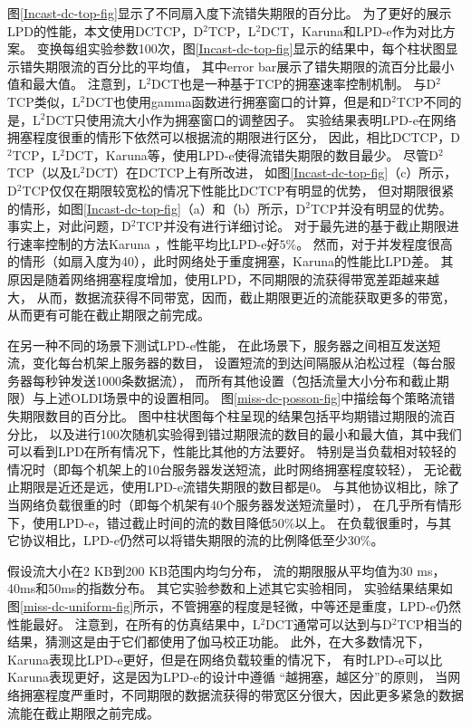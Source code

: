 图\ref{Incast-dc-top-fig}显示了不同扇入度下流错失期限的百分比。
为了更好的展示LPD的性能，本文使用DCTCP，D$^2$TCP，L$^2$DCT，Karuna和LPD-e作为对比方案。
变换每组实验参数100次，图\ref{Incast-dc-top-fig}显示的结果中，每个柱状图显示错失期限流的百分比的平均值，
其中error bar展示了错失期限的流百分比最小值和最大值。
注意到，L$^2$DCT也是一种基于TCP的拥塞速率控制机制。
与D$^2$TCP类似，L$^2$DCT也使用gamma函数进行拥塞窗口的计算，但是和D$^2$TCP不同的是，L$^2$DCT只使用流大小作为拥塞窗口的调整因子。
实验结果表明LPD-e在网络拥塞程度很重的情形下依然可以根据流的期限进行区分，
因此，相比DCTCP，D$^2$TCP，L$^2$DCT，Karuna等，使用LPD-e使得流错失期限的数目最少。
尽管D$^2$TCP（以及L$^2$DCT）在DCTCP上有所改进，
如图\ref{Incast-dc-top-fig}（c）所示，D$^2$TCP仅仅在期限较宽松的情况下性能比DCTCP有明显的优势，
但对期限很紧的情形，如图\ref{Incast-dc-top-fig}（a）和（b）所示，D$^2$TCP并没有明显的优势。
事实上，对此问题，D$^2$TCP\cite{D2TCP}并没有进行详细讨论。
对于最先进的基于截止期限进行速率控制的方法Karuna \cite{chen2016scheduling}，性能平均比LPD-e好$5\%$。
然而，对于并发程度很高的情形（如扇入度为40），此时网络处于重度拥塞，Karuna的性能比LPD差。
其原因是随着网络拥塞程度增加，使用LPD，不同期限的流获得带宽差距越来越大，
从而，数据流获得不同带宽，因而，截止期限更近的流能获取更多的带宽，从而更有可能在截止期限之前完成。



在另一种不同的场景下测试LPD-e性能，
在此场景下，服务器之间相互发送短流，变化每台机架上服务器的数目，
设置短流的到达间隔服从泊松过程（每台服务器每秒钟发送1000条数据流），
而所有其他设置（包括流量大小分布和截止期限）与上述OLDI场景中的设置相同。
图\ref{miss-dc-posson-fig}中描绘每个策略流错失期限数目的百分比。
图中柱状图每个柱呈现的结果包括平均期错过期限的流百分比，
以及进行100次随机实验得到错过期限流的数目的最小和最大值，其中我们可以看到LPD在所有情况下，性能比其他的方法要好。
特别是当负载相对较轻的情况时（即每个机架上的10台服务器发送短流，此时网络拥塞程度较轻），
无论截止期限是近还是远，使用LPD-e流错失期限的数目都是0。
与其他协议相比，除了当网络负载很重的时（即每个机架有40个服务器发送短流量时），
在几乎所有情形下，使用LPD-e，错过截止时间的流的数目降低$50\%$以上。
在负载很重时，与其它协议相比，LPD-e仍然可以将错失期限的流的比例降低至少$30\%$。

假设流大小在2 KB到200 KB范围内均匀分布，
流的期限服从平均值为30 ms，40ms和50ms的指数分布。
其它实验参数和上述其它实验相同，
实验结果结果如图\ref{miss-dc-uniform-fig}所示，不管拥塞的程度是轻微，中等还是重度，LPD-e仍然性能最好。
注意到，在所有的仿真结果中，L$^2$DCT通常可以达到与D$^2$TCP相当的结果，猜测这是由于它们都使用了伽马校正功能。
此外，在大多数情况下，Karuna表现比LPD-e更好，但是在网络负载较重的情况下，
有时LPD-e可以比Karuna表现更好，这是因为LPD-e的设计中遵循 “越拥塞，越区分”的原则，
当网络拥塞程度严重时，不同期限的数据流获得的带宽区分很大，因此更多紧急的数据流能在截止期限之前完成。

